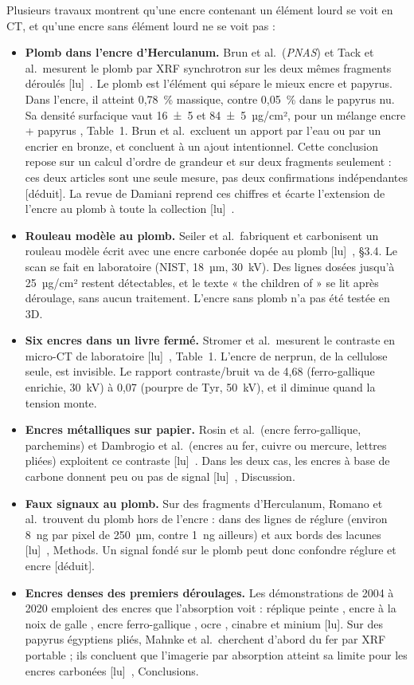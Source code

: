\documentclass[11pt,a4paper]{article}
\newcommand{\lu}{\textsf{\small[lu]}}
\newcommand{\deduit}{\textsf{\small[déduit]}}
\begin{document}
Plusieurs travaux montrent qu'une encre contenant un élément lourd se voit en CT, et qu'une
encre sans élément lourd ne se voit pas :
\begin{itemize}
  \item \textbf{Plomb dans l'encre d'Herculanum.} Brun et al.\ (\emph{PNAS}) et Tack et al.\
  mesurent le plomb par XRF synchrotron sur les deux mêmes fragments déroulés
  \lu~\cite{brun2016,tack2016}. Le plomb est l'élément qui sépare le mieux encre et papyrus.
  Dans l'encre, il atteint 0,78~\% massique, contre 0,05~\% dans le papyrus nu. Sa densité
  surfacique vaut 16~±~5 et 84~±~5~µg/cm², pour un mélange encre + papyrus
  \cite{tack2016}, Table~1. Brun et al.\ excluent un apport par l'eau ou par un encrier en
  bronze, et concluent à un ajout intentionnel. Cette conclusion repose sur un calcul
  d'ordre de grandeur et sur deux fragments seulement : ces deux articles sont une seule
  mesure, pas deux confirmations indépendantes \deduit. La revue de Damiani reprend ces
  chiffres et écarte l'extension de l'encre au plomb à toute la collection
  \lu~\cite{damiani2021}.
  \item \textbf{Rouleau modèle au plomb.} Seiler et al.\ fabriquent et carbonisent un rouleau
  modèle écrit avec une encre carbonée dopée au plomb \lu~\cite{seiler2026}, §3.4. Le scan se
  fait en laboratoire (NIST, 18~µm, 30~kV). Des lignes dosées jusqu'à 25~µg/cm² restent
  détectables, et le texte « the children of » se lit après déroulage, sans aucun
  traitement. L'encre sans plomb n'a pas été testée en 3D.
  \item \textbf{Six encres dans un livre fermé.} Stromer et al.\ mesurent le contraste en
  micro-CT de laboratoire \lu~\cite{stromer2018}, Table~1. L'encre de nerprun, de la cellulose
  seule, est invisible. Le rapport contraste/bruit va de 4,68 (ferro-gallique enrichie, 30~kV)
  à 0,07 (pourpre de Tyr, 50~kV), et il diminue quand la tension monte.
  \item \textbf{Encres métalliques sur papier.} Rosin et al.\ (encre ferro-gallique,
  parchemins) et Dambrogio et al.\ (encres au fer, cuivre ou mercure, lettres pliées)
  exploitent ce contraste \lu~\cite{rosin2018,dambrogio2021}. Dans les deux cas, les encres à
  base de carbone donnent peu ou pas de signal \lu~\cite{dambrogio2021}, Discussion.
  \item \textbf{Faux signaux au plomb.} Sur des fragments d'Herculanum, Romano et al.\ trouvent
  du plomb hors de l'encre : dans des lignes de réglure (environ 8~ng par pixel de 250~µm,
  contre 1~ng ailleurs) et aux bords des lacunes \lu~\cite{romano2023}, Methods. Un signal
  fondé sur le plomb peut donc confondre réglure et encre \deduit.
  \item \textbf{Encres denses des premiers déroulages.} Les démonstrations de 2004 à 2020
  emploient des encres que l'absorption voit : réplique peinte \cite{seales2004}, encre à la
  noix de galle \cite{lin2005}, encre ferro-gallique \cite{mills2012}, ocre \cite{allegra2015},
  cinabre et minium \cite{baum2017} \lu. Sur des papyrus égyptiens pliés, Mahnke et al.\
  cherchent d'abord du fer par XRF portable ; ils concluent que l'imagerie par absorption
  atteint sa limite pour les encres carbonées \lu~\cite{mahnke2020}, Conclusions.
\end{itemize}
\end{document}
